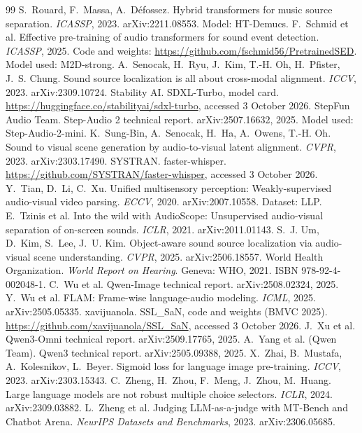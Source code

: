 \begin{thebibliography}{99}
 S.~Rouard, F.~Massa, A.~D\'efossez. Hybrid transformers for music source separation. \emph{ICASSP}, 2023. arXiv:2211.08553. Model: HT-Demucs.
 F.~Schmid et al. Effective pre-training of audio transformers for sound event detection. \emph{ICASSP}, 2025. Code and weights: \url{https://github.com/fschmid56/PretrainedSED}. Model used: M2D-strong.
 A.~Senocak, H.~Ryu, J.~Kim, T.-H. Oh, H.~Pfister, J.~S. Chung. Sound source localization is all about cross-modal alignment. \emph{ICCV}, 2023. arXiv:2309.10724.
 Stability AI. SDXL-Turbo, model card. \url{https://huggingface.co/stabilityai/sdxl-turbo}, accessed 3 October 2026.
 StepFun Audio Team. Step-Audio 2 technical report. arXiv:2507.16632, 2025. Model used: Step-Audio-2-mini.
 K.~Sung-Bin, A.~Senocak, H.~Ha, A.~Owens, T.-H. Oh. Sound to visual scene generation by audio-to-visual latent alignment. \emph{CVPR}, 2023. arXiv:2303.17490.
 SYSTRAN. faster-whisper. \url{https://github.com/SYSTRAN/faster-whisper}, accessed 3 October 2026.
 Y.~Tian, D.~Li, C.~Xu. Unified multisensory perception: Weakly-supervised audio-visual video parsing. \emph{ECCV}, 2020. arXiv:2007.10558. Dataset: LLP.
 E.~Tzinis et al. Into the wild with AudioScope: Unsupervised audio-visual separation of on-screen sounds. \emph{ICLR}, 2021. arXiv:2011.01143.
 S.~J. Um, D.~Kim, S.~Lee, J.~U. Kim. Object-aware sound source localization via audio-visual scene understanding. \emph{CVPR}, 2025. arXiv:2506.18557.
 World Health Organization. \emph{World Report on Hearing}. Geneva: WHO, 2021. ISBN 978-92-4-002048-1.
 C.~Wu et al. Qwen-Image technical report. arXiv:2508.02324, 2025.
 Y.~Wu et al. FLAM: Frame-wise language-audio modeling. \emph{ICML}, 2025. arXiv:2505.05335.
 xavijuanola. SSL\_SaN, code and weights (BMVC 2025). \url{https://github.com/xavijuanola/SSL_SaN}, accessed 3 October 2026.
 J.~Xu et al. Qwen3-Omni technical report. arXiv:2509.17765, 2025.
 A.~Yang et al. (Qwen Team). Qwen3 technical report. arXiv:2505.09388, 2025.
 X.~Zhai, B.~Mustafa, A.~Kolesnikov, L.~Beyer. Sigmoid loss for language image pre-training. \emph{ICCV}, 2023. arXiv:2303.15343.
 C.~Zheng, H.~Zhou, F.~Meng, J.~Zhou, M.~Huang. Large language models are not robust multiple choice selectors. \emph{ICLR}, 2024. arXiv:2309.03882.
 L.~Zheng et al. Judging LLM-as-a-judge with MT-Bench and Chatbot Arena. \emph{NeurIPS Datasets and Benchmarks}, 2023. arXiv:2306.05685.

\end{thebibliography}
